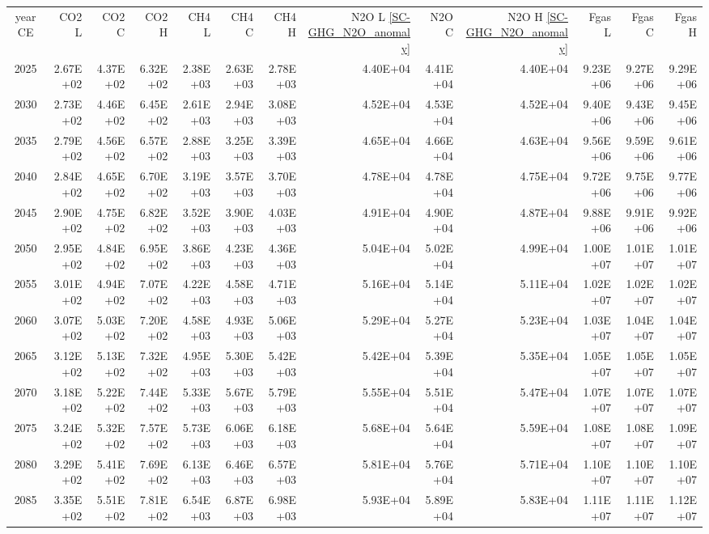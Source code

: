 \documentclass{article}
\begin{document}
\begin{table}
\begin{tabular}{crrr|rrr|rrr|rrr}
year CE  & CO2 L    & CO2 C    & CO2 H    & CH4 L    & CH4 C    & CH4 H    & N2O L \ref{SC-GHG_N2O_anomaly}     & N2O C      & N2O H \ref{SC-GHG_N2O_anomaly}    & Fgas L   & Fgas C   & Fgas H   \\
2025     & 2.67E+02 & 4.37E+02 & 6.32E+02 & 2.38E+03 & 2.63E+03 & 2.78E+03 & 4.40E+04 & 4.41E+04 & 4.40E+04 & 9.23E+06 & 9.27E+06 & 9.29E+06 \\
2030     & 2.73E+02 & 4.46E+02 & 6.45E+02 & 2.61E+03 & 2.94E+03 & 3.08E+03 & 4.52E+04 & 4.53E+04 & 4.52E+04 & 9.40E+06 & 9.43E+06 & 9.45E+06 \\
2035     & 2.79E+02 & 4.56E+02 & 6.57E+02 & 2.88E+03 & 3.25E+03 & 3.39E+03 & 4.65E+04 & 4.66E+04 & 4.63E+04 & 9.56E+06 & 9.59E+06 & 9.61E+06 \\
2040     & 2.84E+02 & 4.65E+02 & 6.70E+02 & 3.19E+03 & 3.57E+03 & 3.70E+03 & 4.78E+04 & 4.78E+04 & 4.75E+04 & 9.72E+06 & 9.75E+06 & 9.77E+06 \\
2045     & 2.90E+02 & 4.75E+02 & 6.82E+02 & 3.52E+03 & 3.90E+03 & 4.03E+03 & 4.91E+04 & 4.90E+04 & 4.87E+04 & 9.88E+06 & 9.91E+06 & 9.92E+06 \\
2050     & 2.95E+02 & 4.84E+02 & 6.95E+02 & 3.86E+03 & 4.23E+03 & 4.36E+03 & 5.04E+04 & 5.02E+04 & 4.99E+04 & 1.00E+07 & 1.01E+07 & 1.01E+07 \\
2055     & 3.01E+02 & 4.94E+02 & 7.07E+02 & 4.22E+03 & 4.58E+03 & 4.71E+03 & 5.16E+04 & 5.14E+04 & 5.11E+04 & 1.02E+07 & 1.02E+07 & 1.02E+07 \\
2060     & 3.07E+02 & 5.03E+02 & 7.20E+02 & 4.58E+03 & 4.93E+03 & 5.06E+03 & 5.29E+04 & 5.27E+04 & 5.23E+04 & 1.03E+07 & 1.04E+07 & 1.04E+07 \\
2065     & 3.12E+02 & 5.13E+02 & 7.32E+02 & 4.95E+03 & 5.30E+03 & 5.42E+03 & 5.42E+04 & 5.39E+04 & 5.35E+04 & 1.05E+07 & 1.05E+07 & 1.05E+07 \\
2070     & 3.18E+02 & 5.22E+02 & 7.44E+02 & 5.33E+03 & 5.67E+03 & 5.79E+03 & 5.55E+04 & 5.51E+04 & 5.47E+04 & 1.07E+07 & 1.07E+07 & 1.07E+07 \\
2075     & 3.24E+02 & 5.32E+02 & 7.57E+02 & 5.73E+03 & 6.06E+03 & 6.18E+03 & 5.68E+04 & 5.64E+04 & 5.59E+04 & 1.08E+07 & 1.08E+07 & 1.09E+07 \\
2080     & 3.29E+02 & 5.41E+02 & 7.69E+02 & 6.13E+03 & 6.46E+03 & 6.57E+03 & 5.81E+04 & 5.76E+04 & 5.71E+04 & 1.10E+07 & 1.10E+07 & 1.10E+07 \\
2085     & 3.35E+02 & 5.51E+02 & 7.81E+02 & 6.54E+03 & 6.87E+03 & 6.98E+03 & 5.93E+04 & 5.89E+04 & 5.83E+04 & 1.11E+07 & 1.11E+07 & 1.12E+07 \\

\end{tabular}
\end{table}
\end{document}
